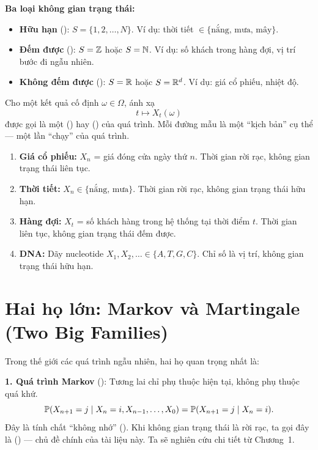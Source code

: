 \textbf{Ba loại không gian trạng thái:}
\begin{itemize}[nosep]
  \item \textbf{Hữu hạn} (): $S = \{1, 2, \ldots, N\}$.
    Ví dụ: thời tiết $\in \{\text{nắng, mưa, mây}\}$.
  \item \textbf{Đếm được} (): $S = \mathbb{Z}$ hoặc $S = \mathbb{N}$.
    Ví dụ: số khách trong hàng đợi, vị trí bước đi ngẫu nhiên.
  \item \textbf{Không đếm được} (): $S = \mathbb{R}$ hoặc $S = \mathbb{R}^d$.
    Ví dụ: giá cổ phiếu, nhiệt độ.
\end{itemize}

\begin{dinhnghia}
\label{def:sample-path}
Cho một kết quả cố định $\omega \in \Omega$, ánh xạ
\[
  t \mapsto X_t(\omega)
\]
được gọi là một  () hay  () của quá trình.
Mỗi đường mẫu là một ``kịch bản'' cụ thể --- một lần ``chạy'' của quá trình.
\end{dinhnghia}

\begin{example}
\label{ex:real-world-sp}
\begin{enumerate}[nosep]
  \item \textbf{Giá cổ phiếu:} $X_n$ = giá đóng cửa ngày thứ $n$. Thời gian rời rạc, không gian trạng thái liên tục.
  \item \textbf{Thời tiết:} $X_n \in \{\text{nắng, mưa}\}$. Thời gian rời rạc, không gian trạng thái hữu hạn.
  \item \textbf{Hàng đợi:} $X_t$ = số khách hàng trong hệ thống tại thời điểm $t$. Thời gian liên tục, không gian trạng thái đếm được.
  \item \textbf{DNA:} Dãy nucleotide $X_1, X_2, \ldots \in \{A, T, G, C\}$. Chỉ số là vị trí, không gian trạng thái hữu hạn.
\end{enumerate}
\end{example}

\section{Hai họ lớn: Markov và Martingale (Two Big Families)}
\label{sec:two-families}

Trong thế giới các quá trình ngẫu nhiên, hai họ quan trọng nhất là:

\textbf{1. Quá trình Markov} (): Tương lai chỉ phụ thuộc hiện tại, không phụ thuộc quá khứ.
\[
  \mathbb{P}(X_{n+1} = j \mid X_n = i, X_{n-1}, \ldots, X_0) = \mathbb{P}(X_{n+1} = j \mid X_n = i).
\]
Đây là tính chất ``không nhớ'' (). Khi không gian trạng thái là rời rạc,
ta gọi đây là  () --- chủ đề chính của tài liệu này.
Ta sẽ nghiên cứu chi tiết từ Chương~1.

